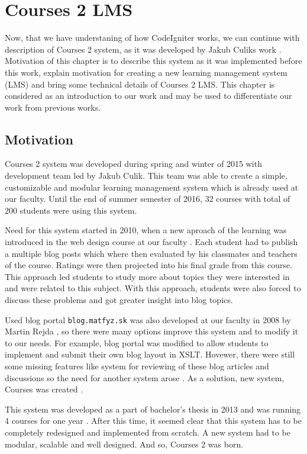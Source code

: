 \chapter{Courses 2 LMS}



Now, that we have understaning of how CodeIgniter works, we can continue with description of Courses 2 system, as it was developed by Jakub Culiks work \cite{culik}. Motivation of this chapter is to describe this system as it was implemented before this work, explain motivation for creating a new learning management system (LMS) and bring some technical details of Courses 2 LMS. This chapter is considered as an introduction to our work and may be used to differentiate our work from previous works.

\section{Motivation}

Courses 2 system was developed during spring and winter of 2015 with development team led by Jakub Culik. This team was able to create a simple, customizable and modular learning management system which is already used at our faculty. Until the end of summer semester of 2016, 32 courses with total of 200 students were using this system.


Need for this system started in 2010, when a new aproach of the learning was introduced in the web design course at our faculty \cite{culik}. Each student had to publish a multiple blog posts which where then evaluated by his classmates and teachers of the course. Ratings were then projected into his final grade from this course. This approach led students to study more about topics they were interested in and were related to this subject. With this approach, students were also forced to discuss these problems and got greater insight into blog topics.


Used blog portal \texttt{blog.matfyz.sk} was also developed at our faculty in 2008 by Martin Rejda \cite{rejda}, so there were many options improve this system and to modify it to our needs. For example, blog portal was modified to allow students to implement and submit their own blog layout in XSLT. Hovewer, there were still some missing features like system for reviewing of these blog articles and discussions so the need for another system arose \cite{culik}. As a solution, new system, Courses was created \cite{culikbc}.


This system was developed as a part of bachelor's thesis in 2013 \cite{culikbc} and was running 4 courses for one year \cite{culik}. After this time, it seemed clear that this system has to be completely redesigned and implemented from scratch. A new system had to be modular, scalable and well designed. And so, Courses 2 was born.

